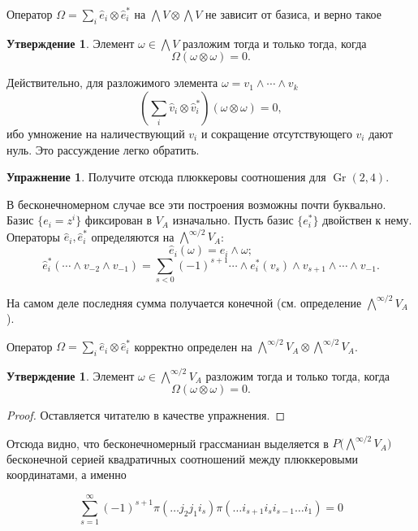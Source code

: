 \documentclass{article}
\theoremstyle{definition}
\theoremstyle{definition} %
\theoremstyle{remark}     %
\theoremstyle{definition}
\theoremstyle{definition}
\theoremstyle{definition}
\newtheorem{statement}[theorem]{Утверждение}
\theoremstyle{definition}
\theoremstyle{definition}
\theoremstyle{definition}
\theoremstyle{definition}
\theoremstyle{definition}
\newtheorem{exercise}{Упражнение}[section]
\begin{document}
Оператор \(\Omega = \sum_i \hat{e}_i \otimes \hat{e}_i^*\) на \(\bigwedge V \otimes \bigwedge V\) не зависит от базиса, и верно такое

\begin{statement}
  Элемент \(\omega \in \bigwedge V\) разложим тогда и только тогда, когда  
  \[
    \Omega(\omega \otimes \omega) = 0.
  \]
\end{statement}


Действительно, для разложимого элемента \(\omega = v_1 \wedge \cdots \wedge v_k\)  
\[
    \left( \sum_i \hat{v}_i \otimes \hat{v}_i^* \right)(\omega \otimes \omega) = 0,
\]
ибо умножение на наличествующий \(v_i\) и сокращение отсутствующего \(v_i\) дают нуль. Это рассуждение легко обратить.

\begin{exercise}
  Получите отсюда плюккеровы соотношения для \(\operatorname{Gr}(2,4)\).
\end{exercise}

В бесконечномерном случае все эти построения возможны почти буквально. Базис \(\{e_i = z^i\}\) фиксирован в \(V_A\) изначально. Пусть базис \(\{e_i^*\}\) двойствен к нему. Операторы \(\hat{e}_i, \hat{e}_i^*\) определяются на \(\bigwedge^{\infty/2} V_A\):  
\[
    \hat{e}_i(\omega) = e_i \wedge \omega;
\]
\[
    \hat{e}_i^*( \cdots \wedge v_{-2} \wedge v_{-1} ) = \sum_{s < 0} (-1)^{s+1} \cdots \wedge e_i^*(v_s) \wedge v_{s+1} \wedge \cdots \wedge v_{-1}.
\]

На самом деле последняя сумма получается конечной (см. определение \(\bigwedge^{\infty/2} V_A\)). 

Оператор \(\Omega = \sum_i \hat{e}_i \otimes \hat{e}_i^*\) корректно определен на \(\bigwedge^{\infty/2} V_A \otimes \bigwedge^{\infty/2} V_A\).

\begin{statement}
  Элемент \(\omega \in \bigwedge^{\infty/2} V_A\) разложим тогда и только тогда, когда  
  \[
    \Omega(\omega \otimes \omega) = 0.
  \]
\end{statement}

\begin{proof}
  Оставляется читателю в качестве упражнения.
\end{proof}

Отсюда видно, что бесконечномерный грассманиан выделяется в  
\(P\bigl(\bigwedge^{\infty/2} V_A\bigr)\) бесконечной серией квадратичных соотношений между плюккеровыми координатами, а именно  


\begin{equation*}\label{eq:PL}
    \sum_{s=1}^\infty (-1)^{s+1} \pi (\dots j_2 j_1 i_s) \pi (\dots i_{s+1} i_s i_{s-1} \dots i_1) = 0 \tag{PL}
\end{equation*}
\end{document}
